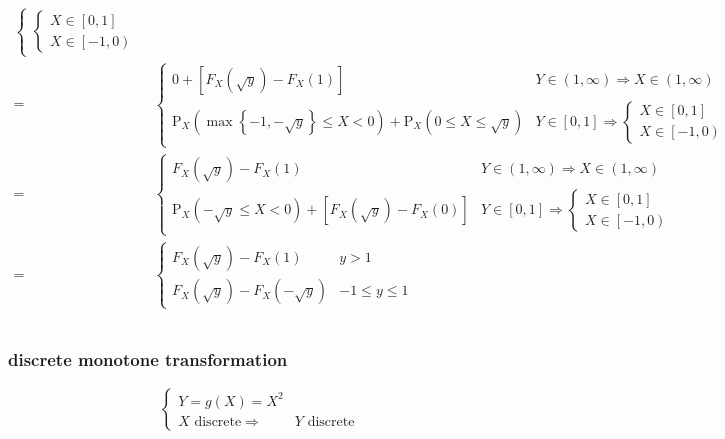 \documentclass[
]{book}
\theoremstyle{definition}
\theoremstyle{definition}
\theoremstyle{definition}
\theoremstyle{definition}
\theoremstyle{remark}
\begin{document}
\[\begin{aligned}
\begin{cases}
\begin{cases}
X\in\left[0,1\right]\\
X\in\left[-1,0\right)
\end{cases}
\end{cases}\\
= & \begin{cases}
0+\left[F_{{\scriptscriptstyle X}}\left(\sqrt{y}\right)-F_{{\scriptscriptstyle X}}\left(1\right)\right] & Y\in\left(1,\infty\right)\Rightarrow X\in\left(1,\infty\right)\\
\mathrm{P}_{{\scriptscriptstyle X}}\left(\max\left\{ -1,-\sqrt{y}\right\} \le X<0\right)+\mathrm{P}_{{\scriptscriptstyle X}}\left(0\le X\le\sqrt{y}\right) & Y\in\left[0,1\right]\Rightarrow\begin{cases}
X\in\left[0,1\right]\\
X\in\left[-1,0\right)
\end{cases}
\end{cases}\\
= & \begin{cases}
F_{{\scriptscriptstyle X}}\left(\sqrt{y}\right)-F_{{\scriptscriptstyle X}}\left(1\right) & Y\in\left(1,\infty\right)\Rightarrow X\in\left(1,\infty\right)\\
\mathrm{P}_{{\scriptscriptstyle X}}\left(-\sqrt{y}\le X<0\right)+\left[F_{{\scriptscriptstyle X}}\left(\sqrt{y}\right)-F_{{\scriptscriptstyle X}}\left(0\right)\right] & Y\in\left[0,1\right]\Rightarrow\begin{cases}
X\in\left[0,1\right]\\
X\in\left[-1,0\right)
\end{cases}
\end{cases}\\
= & \begin{cases}
F_{{\scriptscriptstyle X}}\left(\sqrt{y}\right)-F_{{\scriptscriptstyle X}}\left(1\right) & y>1\\
F_{{\scriptscriptstyle X}}\left(\sqrt{y}\right)-F_{{\scriptscriptstyle X}}\left(-\sqrt{y}\right) & -1\le y\le1
\end{cases}
\end{aligned}
\]

\[
\tag*{$\Box$}
\]

\hypertarget{discrete-monotone-transformation}{%
\subsubsection{discrete monotone transformation}\label{discrete-monotone-transformation}}

\[
\begin{cases}
Y=g\left(X\right)=X^{2}\\
X\text{ discrete}\Rightarrow & Y\text{ discrete}
\end{cases}
\]
\end{document}
